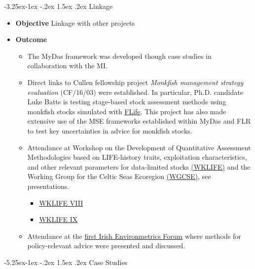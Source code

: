 \documentclass[a4paper, 10pt]{article}
\makeatletter
\renewcommand{\subsection}{\@startsection{subsection}{2}{\z@}%
 {-3.25ex\@plus -1ex \@minus -.2ex}%
 {1.5ex \@plus .2ex}%
 {\normalfont\bfseries\slshape}}
\renewcommand{\section}{\@startsection{section}{1}{\z@}%
 {-5.25ex\@plus -1ex \@minus -.2ex}%
 {1.5ex \@plus .2ex}%
 {\normalfont\bfseries}}
\makeatother
\begin{document}
\subsection{Linkage}

\begin{itemize}[labelindent=\parindent,noitemsep,topsep=0pt,parsep=0pt,partopsep=0pt]
 \item \textbf{Objective} Linkage with other projects
 \item \textbf{Outcome}
  \begin{itemize} 
  \item The MyDas framework was developed though case studies in collaboration with the MI.
  \item Direct links to Cullen fellowship project \emph{Monkfish management strategy evaluation} (CF/16/03) were established. In particular, Ph.D. candidate Luke Batts is testing stage-based stock assessment methods using monkfish stocks simulated with \href{https://github.com/flr/flife}{FLife}. This project has also made extensive use of the MSE frameworks established within MyDas and FLR to test key uncertainties in advice for monkfish stocks. 
  \item Attendance at Workshop on the Development of Quantitative Assessment Methodologies based on LIFE-history traits, exploitation characteristics, and other relevant parameters for data-limited stocks \href{https://www.ices.dk/community/groups/Pages/WKLIFEIX.aspx}{(WKLIFE)} and the Working Group for the Celtic Seas Ecoregion \href{https://www.ices.dk/community/groups/Pages/WGCSE.aspx}{(WGCSE)}, see presentations.
  \begin{itemize}
   \item \href{https://3o2y9wugzp1kfxr5hvzgzq-on.drv.tw/MyDas/presentations/mydas-wklifeix.html}{WKLIFE VIII}
   \item \href{https://3o2y9wugzp1kfxr5hvzgzq-on.drv.tw/MyDas/presentations/mydas-wklifeviii.html}{WKLIFE IX} 
 \end{itemize}
 \item Attendance at the \href{https://www.marine.ie/Home/site-area/news-events/news/first-environmetrics-forum-data-experts-ireland}{first Irish Environmetrics Forum} where methods for policy-relevant advice were presented and discussed.
 \end{itemize}
\end{itemize}

\newpage\section{Case Studies}
 
\end{document}

